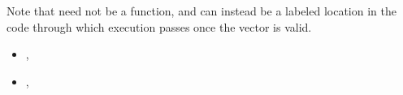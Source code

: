 Note that  need not be a function,
and can instead be a labeled location in the code through which
execution passes once the vector is valid.

\crossreferences
\begin{itemize}
\item
  , 
\item
  , 
\end{itemize}


